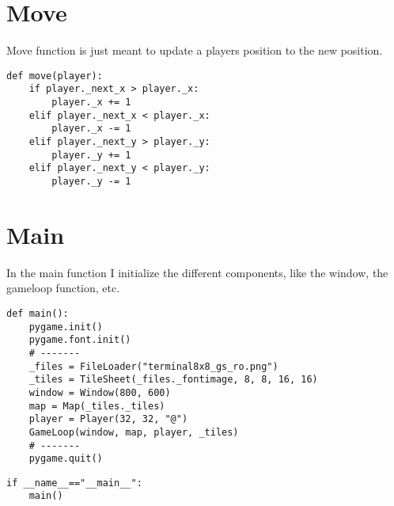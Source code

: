 \documentclass[11pt]{article}
\begin{document}
\section{Move}
\label{sec:org0954ff8}

Move function is just meant to update a players position to the new position.

\begin{verbatim}
def move(player):
    if player._next_x > player._x:
        player._x += 1
    elif player._next_x < player._x:
        player._x -= 1
    elif player._next_y > player._y:
        player._y += 1
    elif player._next_y < player._y:
        player._y -= 1
\end{verbatim}

\section{Main}
\label{sec:org8814df0}

In the main function I initialize the different components, like the window, the gameloop function, etc.

\begin{verbatim}
def main():
    pygame.init()
    pygame.font.init()
    # -------
    _files = FileLoader("terminal8x8_gs_ro.png")
    _tiles = TileSheet(_files._fontimage, 8, 8, 16, 16)
    window = Window(800, 600)
    map = Map(_tiles._tiles)
    player = Player(32, 32, "@")
    GameLoop(window, map, player, _tiles)
    # -------
    pygame.quit()
\end{verbatim}



\begin{verbatim}
if __name__=="__main__":
    main()
\end{verbatim}
\end{document}
